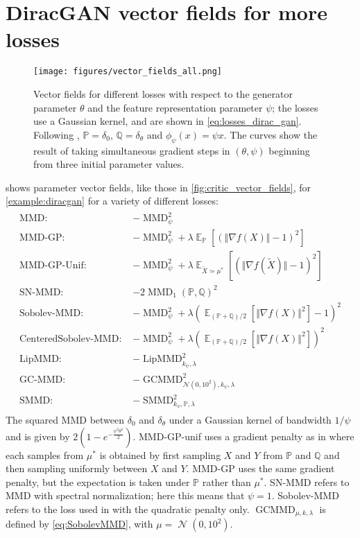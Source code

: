 \documentclass{article}
\DeclareMathOperator{\E}{\mathbb E}
\DeclareMathOperator{\N}{\mathcal N}
\newcommand{\PP}{\mathbb P}
\newcommand{\QQ}{\mathbb Q}
\DeclareMathOperator{\MMD}{MMD}
\DeclareMathOperator{\GCMMD}{GCMMD}
\DeclareMathOperator{\SMMD}{SMMD}
\DeclareMathOperator{\LipMMD}{LipMMD}
\begin{document}
\section{DiracGAN vector fields for more losses} \label{appendix:diracgan-full}
\begin{figure}[ht]
\centering
   \texttt{[image: figures/vector\_fields\_all.png]}
    \caption{Vector fields for different losses with respect to the generator parameter $\theta$ and the feature representation parameter $\psi$;
    the losses use a Gaussian kernel, and are shown in \eqref{eq:losses_dirac_gan}.
    Following \cite{Mescheder:2018}, $\PP = \delta_0$, $\QQ=\delta_{\theta}$ and $\phi_{\psi}(x)= \psi x$.
    The curves show the result of taking simultaneous gradient steps in $(\theta, \psi)$
    beginning from three initial parameter values.}
    \label{fig:vector_fields_all}
\end{figure}
 shows parameter vector fields, like those in \cref{fig:critic_vector_fields}, for \cref{example:diracgan}
for a variety of different losses:
\begin{align}\label{eq:losses_dirac_gan}
\begin{split}
  \text{MMD: }& -\MMD_\psi^2\\
  \text{MMD-GP: }&  -\MMD_\psi^2 +\lambda \E_{\PP}[(\Vert \nabla f(X) \Vert -1)^2]\\
  \text{MMD-GP-Unif: }&  -\MMD_\psi^2 +\lambda \E_{\widetilde{X}\simeq\mu^{*}}[(\Vert \nabla f(\widetilde{X}) \Vert -1)^2]\\
  \text{SN-MMD: }&  -2 \MMD_1(\PP, \QQ)^2 \\
  \text{Sobolev-MMD: }&  -\MMD_\psi^2 + \lambda (\E_{(\PP+\QQ)/2}[\Vert \nabla f(X) \Vert^2]-1)^2\\
  \text{CenteredSobolev-MMD: }&  -\MMD_\psi^2 + \lambda (\E_{(\PP+\QQ)/2}[\Vert \nabla f(X) \Vert^2])^2\\
  \text{LipMMD: }&  -\LipMMD_{k_\psi, \lambda}^2 \\
  \text{GC-MMD: }&  -\GCMMD_{\mathcal{N}(0, 10^2), k_\psi, \lambda}^2 \\
  \text{SMMD: }& -\SMMD_{k_\psi, \PP, \lambda}^2
  \end{split}
\end{align}
The squared MMD between $\delta_0$ and $\delta_{\theta}$ under a Gaussian kernel of bandwidth $1/\psi$ and is given by $2(1-e^{-\frac{\psi^2\theta^2}{2}})$.
MMD-GP-unif uses a gradient penalty as in \cite{Binkowski:2018} where each samples from $\mu^{*}$ is obtained by first sampling $X$ and $Y$ from $\PP$ and $\QQ$ and then sampling uniformly between $X$ and $Y$.
MMD-GP uses the same gradient penalty, but the expectation is taken under $\PP$ rather than $\mu^{*}$.
SN-MMD refers to MMD with spectral normalization; here this means that $\psi=1$.
Sobolev-MMD refers to the loss used in \cite{sobolev-gan} with the quadratic penalty only.
$\GCMMD_{\mu,k,\lambda}$ is defined by \cref{eq:SobolevMMD}, with $\mu = \N(0, 10^2)$.
\end{document}

